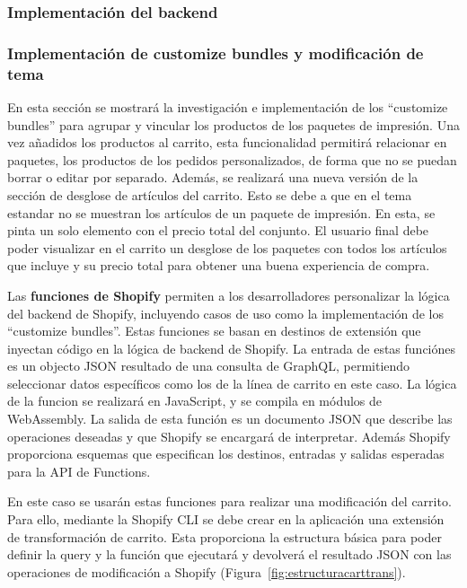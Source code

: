 \documentclass[12pt]{article}
\begin{document}
\clearpage
\subsubsection{Implementación del backend}

\clearpage
\subsubsection{Implementación de customize bundles y modificación de tema}
En esta sección se mostrará la investigación e implementación de los ``customize bundles'' para agrupar y vincular los
productos de los paquetes de impresión. Una vez añadidos los productos al carrito, esta funcionalidad permitirá relacionar en paquetes, los productos de los pedidos personalizados, de forma que no se puedan borrar
o editar por separado. Además, se realizará una nueva versión de la sección de desglose de artículos del carrito. Esto se debe a que en el tema estandar no se muestran los artículos de un paquete 
de impresión. En esta, se pinta un solo elemento con el precio total del conjunto. El usuario final debe poder visualizar en el carrito un desglose de los paquetes con todos los artículos que incluye y su precio 
total para obtener una buena experiencia de compra.

Las \textbf{funciones de Shopify} \cite{shopify-functions} permiten a los desarrolladores personalizar la lógica del backend de Shopify, incluyendo casos de uso como la implementación de los
``customize bundles''. Estas funciones se basan en destinos de extensión que inyectan código en la lógica de backend de Shopify. La entrada de estas funciónes es un objecto JSON resultado de una
consulta de GraphQL, permitiendo seleccionar datos específicos como los de la línea de carrito en este caso. La lógica de la funcion se realizará en JavaScript, y se compila en módulos de WebAssembly.
La salida de esta función es un documento JSON que describe las operaciones deseadas y que Shopify se encargará de interpretar. Además Shopify proporciona esquemas que especifican los 
destinos, entradas y salidas esperadas para la API de Functions.

En este caso se usarán estas funciones para realizar una modificación del carrito. Para ello, mediante la Shopify CLI se debe crear en la aplicación una extensión de transformación de carrito. Esta proporciona 
la estructura básica para poder definir la query y la función que ejecutará y devolverá el resultado JSON con las operaciones de modificación a Shopify (Figura~\ref{fig:estructuracarttrans}). 
\end{document}

